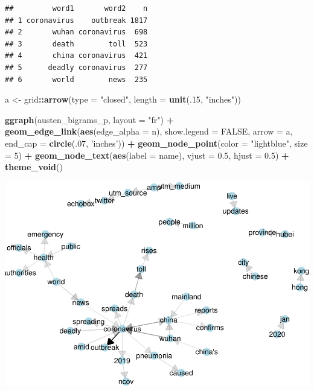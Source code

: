\documentclass[]{article}
\newenvironment{Shaded}{\begin{snugshade}}{\end{snugshade}}
\newcommand{\KeywordTok}[1]{\textcolor[rgb]{0.13,0.29,0.53}{\textbf{#1}}}
\newcommand{\DataTypeTok}[1]{\textcolor[rgb]{0.13,0.29,0.53}{#1}}
\newcommand{\DecValTok}[1]{\textcolor[rgb]{0.00,0.00,0.81}{#1}}
\newcommand{\FloatTok}[1]{\textcolor[rgb]{0.00,0.00,0.81}{#1}}
\newcommand{\StringTok}[1]{\textcolor[rgb]{0.31,0.60,0.02}{#1}}
\newcommand{\OtherTok}[1]{\textcolor[rgb]{0.56,0.35,0.01}{#1}}
\newcommand{\OperatorTok}[1]{\textcolor[rgb]{0.81,0.36,0.00}{\textbf{#1}}}
\newcommand{\NormalTok}[1]{#1}
\begin{document}
\begin{verbatim}
##         word1       word2    n
## 1 coronavirus    outbreak 1817
## 2       wuhan coronavirus  698
## 3       death        toll  523
## 4       china coronavirus  421
## 5      deadly coronavirus  277
## 6       world        news  235
\end{verbatim}

\begin{Shaded}
\begin{Highlighting}[]
\NormalTok{a <-}\StringTok{ }\NormalTok{grid}\OperatorTok{::}\KeywordTok{arrow}\NormalTok{(}\DataTypeTok{type =} \StringTok{"closed"}\NormalTok{, }\DataTypeTok{length =} \KeywordTok{unit}\NormalTok{(.}\DecValTok{15}\NormalTok{, }\StringTok{"inches"}\NormalTok{))}

\KeywordTok{ggraph}\NormalTok{(austen_bigrams_p, }\DataTypeTok{layout =} \StringTok{"fr"}\NormalTok{) }\OperatorTok{+}
\StringTok{  }\KeywordTok{geom_edge_link}\NormalTok{(}\KeywordTok{aes}\NormalTok{(}\DataTypeTok{edge_alpha =}\NormalTok{ n), }\DataTypeTok{show.legend =} \OtherTok{FALSE}\NormalTok{,}
                 \DataTypeTok{arrow =}\NormalTok{ a, }\DataTypeTok{end_cap =} \KeywordTok{circle}\NormalTok{(.}\DecValTok{07}\NormalTok{, }\StringTok{'inches'}\NormalTok{)) }\OperatorTok{+}
\StringTok{  }\KeywordTok{geom_node_point}\NormalTok{(}\DataTypeTok{color =} \StringTok{"lightblue"}\NormalTok{, }\DataTypeTok{size =} \DecValTok{5}\NormalTok{) }\OperatorTok{+}
\StringTok{  }\KeywordTok{geom_node_text}\NormalTok{(}\KeywordTok{aes}\NormalTok{(}\DataTypeTok{label =}\NormalTok{ name), }\DataTypeTok{vjust =} \FloatTok{0.5}\NormalTok{, }\DataTypeTok{hjust =} \FloatTok{0.5}\NormalTok{) }\OperatorTok{+}
\StringTok{  }\KeywordTok{theme_void}\NormalTok{()}
\end{Highlighting}
\end{Shaded}

\includegraphics{nlp_tw_files/figure-latex/unnamed-chunk-3-1.pdf}
\end{document}
